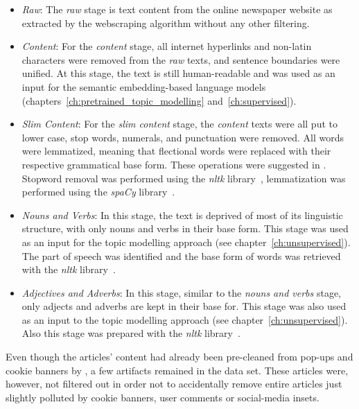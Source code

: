 \begin{itemize}
    \item \textit{Raw}: The \textit{raw} stage is text content from the online newspaper website as extracted by the webscraping algorithm without any other filtering.
    \item \textit{Content}: For the \textit{content} stage, all internet hyperlinks and non-latin characters were removed from the \textit{raw} texts, and sentence boundaries were unified. At this stage, the text is still human-readable and was used as an input for the semantic embedding-based language models (chapters~\ref{ch:pretrained_topic_modelling} and~\ref{ch:supervised}).
    \item \textit{Slim Content}: For the \textit{slim content} stage, the \textit{content} texts were all put to lower case, stop words, numerals, and punctuation were removed. All words were lemmatized, meaning that flectional words were replaced with their respective grammatical base form. These operations were suggested in \textcite[p. 254]{vajjala_practical_2020}. Stopword removal was performed using the \textit{nltk} library~\autocite{bird_natural_2019}, lemmatization was performed using the \textit{spaCy} library~\autocite{spacy_spacy_nodate}.
    \item \textit{Nouns and Verbs}: In this stage, the text is deprived of most of its linguistic structure, with only nouns and verbs in their base form. This stage was used as an input for the topic modelling approach (see chapter~\ref{ch:unsupervised}). The part of speech was identified and the base form of words was retrieved with the \textit{nltk} library~\autocite{bird_natural_2019}.
    \item \textit{Adjectives and Adverbs}: In this stage, similar to the \textit{nouns and verbs} stage, only adjects and adverbs are kept in their base for. This stage was also used as an input to the topic modelling approach (see chapter~\ref{ch:unsupervised}). Also this stage was prepared with the \textit{nltk} library~\autocite{bird_natural_2019}.
\end{itemize}

Even though the articles' content had already been pre-cleaned from pop-ups and cookie banners by \textcite{fenske_using_2022}, a few artifacts remained in the data set. These articles were, however, not filtered out in order not to accidentally remove entire articles just slightly polluted by cookie banners, user comments or social-media insets.


